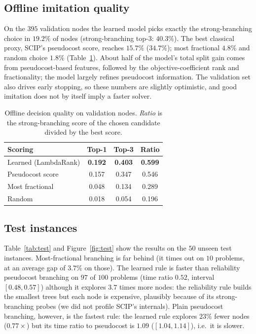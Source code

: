\documentclass[11pt,a4paper]{article}
\begin{document}
\subsection{Offline imitation quality}\label{sec:offline}
On the $395$ validation nodes the learned model picks exactly the strong-branching choice in $19.2\%$ of nodes (strong-branching top-3: $40.3\%$). The best classical proxy, SCIP's pseudocost score, reaches $15.7\%$ ($34.7\%$); most fractional $4.8\%$ and random choice $1.8\%$ (Table~\ref{tab:offline}). About half of the model's total split gain comes from pseudocost-based features, followed by the objective-coefficient rank and fractionality; the model largely refines pseudocost information. The validation set also drives early stopping, so these numbers are slightly optimistic, and good imitation does not by itself imply a faster solver.
 
\begin{table}[t]
\centering
\caption{Offline decision quality on validation nodes. \emph{Ratio} is the strong-branching score of the chosen candidate divided by the best score.}
\label{tab:offline}
\begin{tabular}{lccc}
\toprule
Scoring & Top-1 & Top-3 & Ratio\\
\midrule
Learned (LambdaRank) & \textbf{0.192} & \textbf{0.403} & \textbf{0.599}\\
Pseudocost score     & 0.157 & 0.347 & 0.546\\
Most fractional      & 0.048 & 0.134 & 0.289\\
Random               & 0.018 & 0.054 & 0.196\\
\bottomrule
\end{tabular}
\end{table}
 
\subsection{Test instances}
Table~\ref{tab:test} and Figure~\ref{fig:test} show the results on the $50$ unseen test instances. Most-fractional branching is far behind (it times out on $10$ problems, at an average gap of $3.7\%$ on those). The learned rule is faster than reliability pseudocost branching on $97$ of $100$ problems (time ratio $0.52$, interval $[0.48,0.57]$) although it explores $3.7$ times more nodes: the reliability rule builds the smallest trees but each node is expensive, plausibly because of its strong-branching probes (we did not profile SCIP's internals). Plain pseudocost branching, however, is the fastest rule: the learned rule explores $23\%$ fewer nodes ($0.77\times$) but its time ratio to pseudocost is $1.09$ ($[1.04,1.14]$), i.e.\ it is slower.
 
\end{document}
